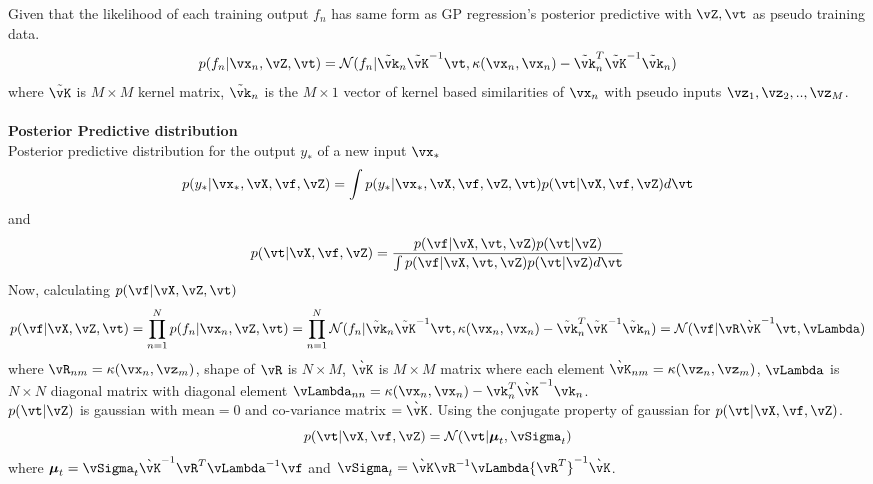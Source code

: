 \documentclass[a4paper,11pt]{article}
\begin{document}
\begin{pmisolution}
Given that the likelihood of each training output \(f_{n}\) has same form as GP regression's posterior predictive with \(\vZ,\vt\) as pseudo training data.\\
\[p(f_{n}|\vx_{n},\vZ,\vt) = \mathcal{N}(f_{n}| \tilde{\vk}_{n}\tilde{\vK}^{-1}\vt, \kappa(\vx_{n},\vx_{n})-\tilde{\vk}_{n}^{T}\tilde{\vK}^{-1}\tilde{\vk}_{n})\]
where \(\tilde{\vK}\) is \(M \times M\) kernel matrix, \(\tilde{\vk}_{n}\) is the \(M \times 1\) vector of kernel based similarities of \(\vx_{n}\) with pseudo inputs \(\vz_{1}, \vz_{2},.., \vz_{M}\).\\\\
\textbf{Posterior Predictive distribution}\\

Posterior predictive distribution for the output \(y_{\ast}\) of a new input \(\vx_{\ast}\)
\[ p(y_{\ast}|\vx_{\ast},\vX,\vf,\vZ) = \int p(y_{\ast}|\vx_{\ast},\vX,\vf,\vZ,\vt)p(\vt|\vX,\vf,\vZ)d\vt\]
and 
\[p(\vt|\vX,\vf,\vZ) = \frac{p(\vf|\vX,\vt,\vZ)p(\vt|\vZ)}{\int p(\vf|\vX,\vt,\vZ)p(\vt|\vZ)d\vt}\]
Now, calculating \(p(\vf|\vX,\vZ,\vt)\)
\[ p(\vf|\vX,\vZ,\vt) = \prod_{n=1}^{N}p(f_{n}|\vx_{n},\vZ,\vt) = \prod_{n=1}^{N}\mathcal{N}(f_{n}| \tilde{\vk}_{n}\tilde{\vK}^{-1}\vt, \kappa(\vx_{n},\vx_{n})-\tilde{\vk}_{n}^{T}\tilde{\vK}^{-1}\tilde{\vk}_{n}) = \mathcal{N}(\vf|\vR\Grave{\vK}^{-1}\vt,\vLambda)\]
where \(\vR_{nm} = \kappa(\vx_{n},\vz_{m})\), shape of \(\vR\) is \(N\times M\), \(\Grave{\vK}\) is \(M \times M\) matrix where each element \(\Grave{\vK}_{nm} = \kappa(\vz_{n},\vz_{m})\), \(\vLambda\) is \(N \times N\) diagonal matrix with diagonal element \(\vLambda_{nn} = \kappa(\vx_{n},\vx_{n}) - \vk_{n}^{T}\Grave{\vK}^{-1}\vk_{n}\).\\
\(p(\vt|\vZ)\) is gaussian with mean\(=0\) and co-variance matrix \(=\Grave{\vK}\). Using the conjugate property of gaussian for \(p(\vt|\vX,\vf,\vZ)\).\\
\[p(\vt|\vX,\vf,\vZ) = \mathcal{N}(\vt|\boldsymbol \mu_{t},\vSigma_{t})\]
where \( \boldsymbol \mu_t = \vSigma_{t}\Grave{\vK}^{-1}\vR^{T}\vLambda^{-1}\vf\) and \(\vSigma_{t} = \Grave{\vK}\vR^{-1}\vLambda{\vR^{T}}^{-1}\Grave{\vK}\).\\


\end{pmisolution}
\end{document}
